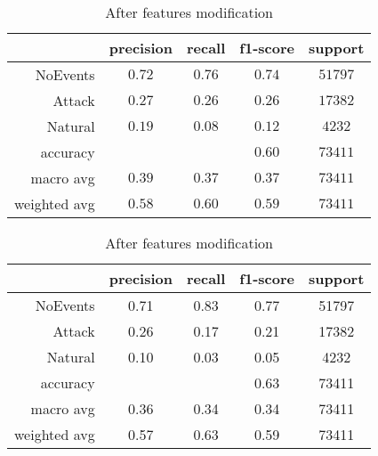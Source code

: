 \begin{table}[H]
    \centering
    \footnotesize
    \caption{Features modification results for Decision Tree classifier} \label{tab:fm_dt}
    \begin{subtable}[t]{.5\linewidth}
        \centering
        \caption{Before features modification} 
        \begin{tabular}{rcccc}\toprule
            & precision    &recall & f1-score  & support \\\midrule
                NoEvents  &   $  0.72 $  &  $ 0.76 $  &  $ 0.74 $  & $ 51797 $\\
                  Attack   &  $  0.27 $   & $ 0.26 $  &  $ 0.26 $  & $ 17382 $\\
                 Natural   &  $  0.19 $   & $ 0.08 $  &  $ 0.12 $  & $  4232 $\\
                accuracy   &            &          &  $0.60$  &   $73411$ \\
               macro avg   &  $  0.39 $   & $ 0.37 $  &  $ 0.37 $  & $ 73411 $\\
            weighted avg   &  $  0.58 $  &  $ 0.60 $  &  $ 0.59 $ &  $ 73411 $\\\bottomrule
        \end{tabular}
    \end{subtable}%
    \begin{subtable}[t]{.5\linewidth}
        \centering
        \caption{After features modification}
        \begin{tabular}{rcccc}\toprule
            &precision   & recall & f1-score &  support  \\\midrule
    
            NoEvents   &    0.71   &   0.83  &    0.77   &  51797 \\
              Attack    &   0.26   &   0.17  &    0.21   &  17382 \\
             Natural   &    0.10   &   0.03   &   0.05  &    4232 \\
        
            accuracy    &          &          &   0.63   &  73411 \\
           macro avg    &   0.36   &   0.34   &   0.34   &  73411 \\
        weighted avg     &  0.57   &   0.63   &   0.59   &  73411    \\     \bottomrule   
        \end{tabular}
    \end{subtable}
\end{table}

